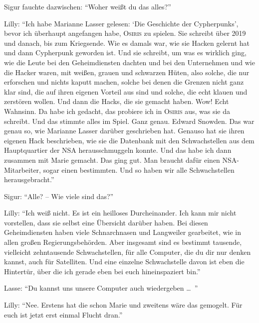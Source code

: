 Sigur fauchte dazwischen: \enquote{Woher weißt du das alles?}

Lilly: \enquote{Ich habe Marianne Lasser gelesen: \enquote{Die Geschichte der Cypherpunks}, bevor ich überhaupt angefangen habe, \textsc{Osiris} zu spielen.
Sie schreibt über 2019 und danach, bis zum Kriegsende.
Wie es damals war, wie sie Hacken gelernt hat und dann Cypherpunk geworden ist.
Und sie schreibt, um was es wirklich ging, wie die Leute bei den Geheimdiensten dachten und bei den Unternehmen und wie die Hacker waren, mit weißen, grauen und schwarzen Hüten, also solche, die nur erforschen und nichts kaputt machen, solche bei denen die Grenzen nicht ganz klar sind, die auf ihren eigenen Vorteil aus sind und solche, die echt klauen und zerstören wollen.
Und dann die Hacks, die sie gemacht haben.
Wow! Echt Wahnsinn.
Da habe ich gedacht, das probiere ich in \textsc{Osiris} aus, was sie da schreibt.
Und das stimmte alles im Spiel.
Ganz genau.
Edward Snowden.
Das war genau so, wie Marianne Lasser darüber geschrieben hat.
Genauso hat sie ihren eigenen Hack beschrieben, wie sie die Datenbank mit den Schwachstellen aus dem Hauptquartier der NSA herausschmuggeln konnte.
Und das habe ich dann zusammen mit Marie gemacht.
Das ging gut.
Man braucht dafür einen NSA-Mitarbeiter, sogar einen bestimmten.
Und so haben wir alle Schwachstellen herausgebracht.}

Sigur: \enquote{Alle? -- Wie viele sind das?}

Lilly: \enquote{Ich weiß nicht.
Es ist ein heilloses Durcheinander.
Ich kann mir nicht vorstellen, dass sie selbst eine Übersicht darüber haben.
Bei diesen Geheimdiensten haben viele Schnarchnasen und Langweiler gearbeitet, wie in allen großen Regierungsbehörden.
Aber insgesamt sind es bestimmt tausende, vielleicht zehntausende Schwachstellen, für alle Computer, die du dir nur denken kannst, auch für Satelliten.
Und eine einzelne Schwachstelle davon ist eben die Hintertür, über die ich gerade eben bei euch hineinspaziert bin.}

Lasse: \enquote{Du kannst uns unsere Computer auch wiedergeben \dots\ }

Lilly: \enquote{Nee.
Erstens hat die schon Marie und zweitens wäre das gemogelt.
Für euch ist jetzt erst einmal Flucht dran.}

